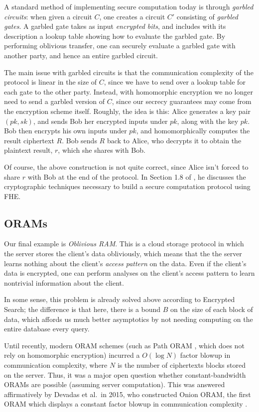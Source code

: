     A standard method of implementing secure computation today is through \emph{garbled circuits}: when given a circuit $C$, one creates a circuit $C'$ consisting of \emph{garbled gates}. A garbled gate takes as input \emph{encrypted bits}, and includes with its description a lookup table showing how to evaluate the garbled gate. By performing oblivious transfer, one can securely evaluate a garbled gate with another party, and hence an entire garbled circuit.

    The main issue with garbled circuits is that the communication complexity of the protocol is linear in the size of $C$, since we have to send over a lookup table for each gate to the other party. Instead, with homomorphic encryption we no longer need to send a garbled version of $C$, since our secrecy guarantees may come from the encryption scheme itself. Roughly, the idea is this: Alice generates a key pair $(pk, sk)$, and sends Bob her encrypted inputs under $pk$, along with the key $pk$. Bob then encrypts his own inputs under $pk$, and homomorphically computes the result ciphertext $R$. Bob sends $R$ back to Alice, who decrypts it to obtain the plaintext result, $r$, which she shares with Bob.

    Of course, the above construction is not quite correct, since Alice isn't forced to share $r$ with Bob at the end of the protocol. In Section 1.8 of \cite{gentry2009fully}, he discusses the cryptographic techniques necessary to build a secure computation protocol using FHE.

\subsection{ORAMs}
    Our final example is \emph{Oblivious RAM}. This is a cloud storage protocol in which the server stores the client's data obliviously, which means that the the server learns nothing about the client's \emph{access pattern} on the data. Even if the client's data is encrypted, one can perform analyses on the client's access pattern to learn nontrivial information about the client.

    In some sense, this problem is already solved above according to Encrypted Search; the difference is that here, there is a bound $B$ on the size of each block of data, which affords us much better asymptotics by not needing computing on the entire database every query.

    Until recently, modern ORAM schemes (such as Path ORAM \cite{Stefanov}, which does not rely on homomorphic encryption) incurred a $O(\log N)$ factor blowup in communication complexity, where $N$ is the number of ciphertexts blocks stored on the server. Thus, it was a major open question whether constant-bandwidth ORAMs are possible (assuming server computation). This was answered affirmatively by Devadas et al.~in 2015, who constructed Onion ORAM, the first ORAM which displays a constant factor blowup in communication complexity \cite{Devadas2016}.

